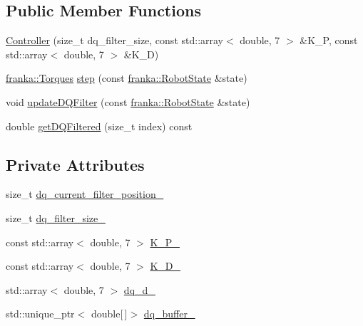 \subsection*{Public Member Functions}
\begin{DoxyCompactItemize}
\item 
\hyperlink{classanonymous__namespace_02motion__with__control_8cpp_03_1_1Controller_aeb856dda629bace767a9cfa421a54008}{Controller} (size\+\_\+t dq\+\_\+filter\+\_\+size, const std\+::array$<$ double, 7 $>$ \&K\+\_\+P, const std\+::array$<$ double, 7 $>$ \&K\+\_\+D)
\item 
\hyperlink{classfranka_1_1Torques}{franka\+::\+Torques} \hyperlink{classanonymous__namespace_02motion__with__control_8cpp_03_1_1Controller_a33dd97681db88864c9897f050f5fd136}{step} (const \hyperlink{structfranka_1_1RobotState}{franka\+::\+Robot\+State} \&state)
\item 
void \hyperlink{classanonymous__namespace_02motion__with__control_8cpp_03_1_1Controller_ac86ec8f40861e51605d5f9c5921c799f}{update\+D\+Q\+Filter} (const \hyperlink{structfranka_1_1RobotState}{franka\+::\+Robot\+State} \&state)
\item 
double \hyperlink{classanonymous__namespace_02motion__with__control_8cpp_03_1_1Controller_a0d18eda568c814126311d95e851094fb}{get\+D\+Q\+Filtered} (size\+\_\+t index) const
\end{DoxyCompactItemize}
\subsection*{Private Attributes}
\begin{DoxyCompactItemize}
\item 
size\+\_\+t \hyperlink{classanonymous__namespace_02motion__with__control_8cpp_03_1_1Controller_a81ac6a197c91f10e2705c015c0ac3144}{dq\+\_\+current\+\_\+filter\+\_\+position\+\_\+}
\item 
size\+\_\+t \hyperlink{classanonymous__namespace_02motion__with__control_8cpp_03_1_1Controller_aa8028a675125bc719556cb50e7736a8f}{dq\+\_\+filter\+\_\+size\+\_\+}
\item 
const std\+::array$<$ double, 7 $>$ \hyperlink{classanonymous__namespace_02motion__with__control_8cpp_03_1_1Controller_a5d89d12c8a2909c46bb45adf35073db2}{K\+\_\+\+P\+\_\+}
\item 
const std\+::array$<$ double, 7 $>$ \hyperlink{classanonymous__namespace_02motion__with__control_8cpp_03_1_1Controller_a51a2e8093f63934c9d64aa0bb7b46b38}{K\+\_\+\+D\+\_\+}
\item 
std\+::array$<$ double, 7 $>$ \hyperlink{classanonymous__namespace_02motion__with__control_8cpp_03_1_1Controller_aa5f5437e65c514358d2a22e74bf0075d}{dq\+\_\+d\+\_\+}
\item 
std\+::unique\+\_\+ptr$<$ double\mbox{[}$\,$\mbox{]}$>$ \hyperlink{classanonymous__namespace_02motion__with__control_8cpp_03_1_1Controller_a9c8092a809e69272e26dc32e7717b128}{dq\+\_\+buffer\+\_\+}
\end{DoxyCompactItemize}


